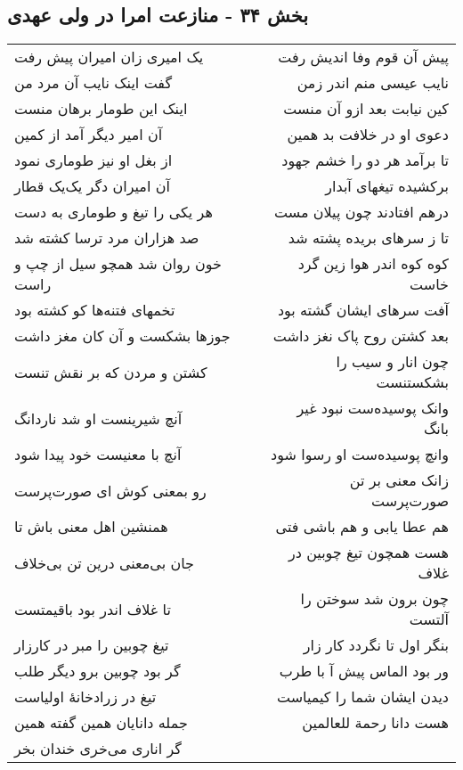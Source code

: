 \begin{center}
\section*{بخش ۳۴ - منازعت امرا در ولی عهدی}
\label{sec:sh034}
\begin{longtable}{l p{0.5cm} r}
یک امیری زان امیران پیش رفت
&&
پیش آن قوم وفا اندیش رفت
\\
گفت اینک نایب آن مرد من
&&
نایب عیسی منم اندر زمن
\\
اینک این طومار برهان منست
&&
کین نیابت بعد ازو آن منست
\\
آن امیر دیگر آمد از کمین
&&
دعوی او در خلافت بد همین
\\
از بغل او نیز طوماری نمود
&&
تا برآمد هر دو را خشم جهود
\\
آن امیران دگر یک‌یک قطار
&&
برکشیده تیغهای آبدار
\\
هر یکی را تیغ و طوماری به دست
&&
درهم افتادند چون پیلان مست
\\
صد هزاران مرد ترسا کشته شد
&&
تا ز سرهای بریده پشته شد
\\
خون روان شد همچو سیل از چپ و راست
&&
کوه کوه اندر هوا زین گرد خاست
\\
تخمهای فتنه‌ها کو کشته بود
&&
آفت سرهای ایشان گشته بود
\\
جوزها بشکست و آن کان مغز داشت
&&
بعد کشتن روح پاک نغز داشت
\\
کشتن و مردن که بر نقش تنست
&&
چون انار و سیب را بشکستنست
\\
آنچ شیرینست او شد ناردانگ
&&
وانک پوسیده‌ست نبود غیر بانگ
\\
آنچ با معنیست خود پیدا شود
&&
وانچ پوسیده‌ست او رسوا شود
\\
رو بمعنی کوش ای صورت‌پرست
&&
زانک معنی بر تن صورت‌پرست
\\
همنشین اهل معنی باش تا
&&
هم عطا یابی و هم باشی فتی
\\
جان بی‌معنی درین تن بی‌خلاف
&&
هست همچون تیغ چوبین در غلاف
\\
تا غلاف اندر بود باقیمتست
&&
چون برون شد سوختن را آلتست
\\
تیغ چوبین را مبر در کارزار
&&
بنگر اول تا نگردد کار زار
\\
گر بود چوبین برو دیگر طلب
&&
ور بود الماس پیش آ با طرب
\\
تیغ در زرادخانهٔ اولیاست
&&
دیدن ایشان شما را کیمیاست
\\
جمله دانایان همین گفته همین
&&
هست دانا رحمة للعالمین
\\
گر اناری می‌خری خندان بخر

\end{longtable}
\end{center}
